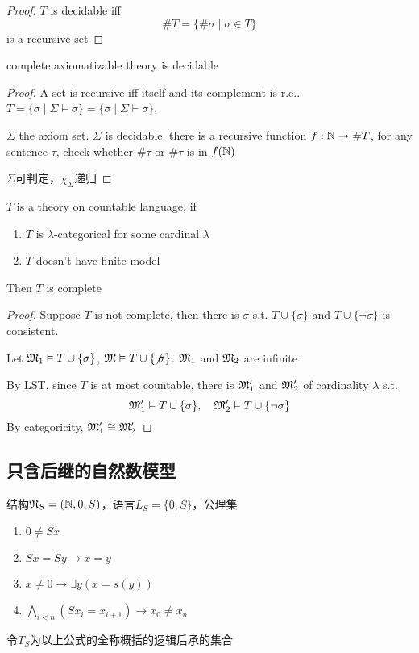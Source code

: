 \documentclass[11pt]{article}
\begin{document}
\begin{proof}
\(T\) is decidable iff
\begin{equation*}
\# T=\{\#\sigma\mid\sigma\in T\}
\end{equation*}
is a recursive set
\end{proof}

\begin{lemma}[]
complete axiomatizable theory is decidable
\end{lemma}

\begin{proof}


A set is recursive iff itself and its complement is r.e.. \(T=\{\sigma\mid\Sigma\vDash\sigma\}=\{\sigma\mid\Sigma\vdash\sigma\}\).

\(\Sigma\) the axiom set. \(\Sigma\) is decidable, there is a recursive function \(f:\mathbb{N}\to\#T\), for any sentence
\(\tau\), check whether \(\#\tau\) or \(\#\tau\) is in \(f(\mathbb{N})\)

\(\Sigma\)可判定，\(\chi_\Sigma\)递归
\end{proof}

\begin{theorem}
\(T\) is a theory on countable language, if
\begin{enumerate}
\item \(T\) is \(\lambda\)-categorical for some cardinal \(\lambda\)
\item \(T\) doesn't have finite model
\end{enumerate}


Then \(T\) is complete
\end{theorem}

\begin{proof}
Suppose \(T\) is not complete, then there is \(\sigma\) s.t. \(T\cup\{\sigma\}\) and \(T\cup\{\neg\sigma\}\) is consistent.

Let \(\mathfrak{M}_1\vDash T\cup\{\sigma\}\), \(\mathfrak{M}\vDash T\cup\{\not\sigma\}\). \(\mathfrak{M}_1\) and \(\mathfrak{M}_2\) are infinite

By LST, since \(T\) is at most countable, there is \(\mathfrak{M}_1'\) and \(\mathfrak{M}_2'\) of cardinality \(\lambda\) s.t.
\begin{equation*}
\mathfrak{M}_1'\vDash T\cup\{\sigma\},\quad\mathfrak{M}_2'\vDash T\cup\{\neg\sigma\}
\end{equation*}
By categoricity, \(\mathfrak{M}_1'\cong\mathfrak{M}_2'\)
\end{proof}
\subsection{只含后继的自然数模型}
\label{sec:org6252fea}
\begin{definition}[]
结构\(\mathfrak{N}_S=(\mathbb{N},0,S)\)，语言\(L_S=\{0,S\}\)，公理集
\begin{enumerate}
\item \(0\neq Sx\)
\item \(Sx=Sy\to x=y\)
\item \(x\neq 0\to\exists y(x=s(y))\)
\item \(\bigwedge_{i<n}(Sx_i=x_{i+1})\to x_0\neq x_n\)
\end{enumerate}


令\(T_S\)为以上公式的全称概括的逻辑后承的集合
\end{definition}
\end{document}
